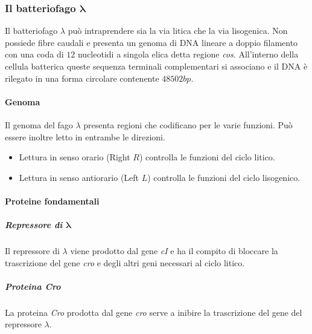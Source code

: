 		\subsubsection{Il batteriofago $\mathbf{\lambda}$}
		Il batteriofago $\lambda$ può intraprendere sia la via litica che la via lisogenica. 
		Non possiede fibre caudali e presenta un genoma di DNA lineare a doppio filamento con una coda di $12$ nucleotidi a singola elica detta regione \emph{cos}. 
		All'interno della cellula batterica queste sequenza terminali complementari si associano e il DNA è rilegato in una forma circolare contenente $48502 bp$.

			\paragraph{Genoma}
			Il genoma del fago $\lambda$ presenta regioni che codificano per le varie funzioni.
			Pu\`o essere inoltre letto in entrambe le direzioni.
			\begin{multicols}{2}
    				\begin{itemize}
        				\item Lettura in senso orario (Right $R$) controlla le funzioni del ciclo litico.
        				\item Lettura in senso antiorario (Left $L$) controlla le funzioni del ciclo lisogenico.
    				\end{itemize}
			\end{multicols}

			\paragraph{Proteine fondamentali}

				\subparagraph{Repressore di $\mathbf{\lambda}$}
				Il repressore di $\lambda$ viene prodotto dal gene \emph{cI} e ha il compito di bloccare la trascrizione del gene \emph{cro} e degli altri geni necessari al ciclo litico.

				\subparagraph{Proteina \emph{Cro}}
				La proteina \emph{Cro} prodotta dal gene \emph{cro} serve a inibire la trascrizione del gene del repressore $\lambda$.
			
